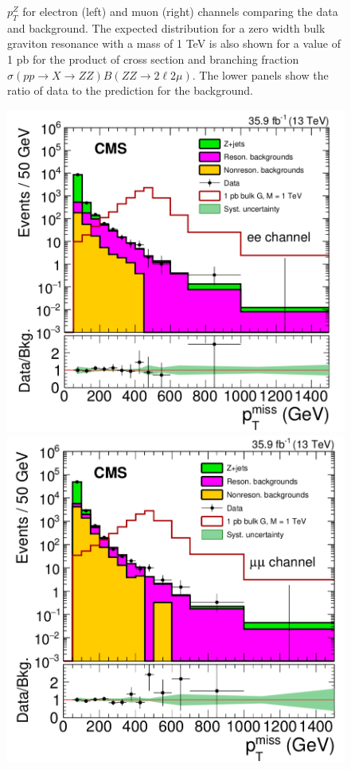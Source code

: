 \begin{figure}[htbp]
\begin{center}
\caption{$p_T ^Z$ for electron (left) and muon (right) channels comparing the data and background. The expected distribution for a zero width bulk graviton resonance with a mass of 1 TeV is also shown for a value of 1 pb for the product of cross section and branching fraction $\sigma(pp\rightarrow X\rightarrow ZZ)B(ZZ\rightarrow 2\ell 2\mu)$. The lower panels show the ratio of data to the prediction for the background. }
\label{fig:sys_uncZpt}
\end{center}
\end{figure}

\begin{figure}[htbp]
\begin{center}
\includegraphics[width=0.9\linewidth]{figures/sys_elSRuncMET.png}
\includegraphics[width=0.9\linewidth]{figures/sys_muSRuncMET.png}

\end{center}
\end{figure}
